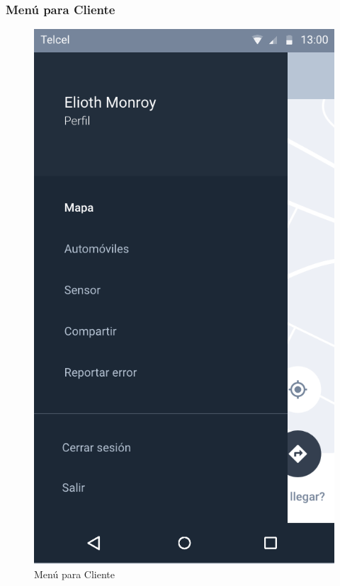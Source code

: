 \subsubsection{Menú para Cliente}\label{Menu-Cliente}
\begin{figure}[H]
	\centering
	\includegraphics[scale=.55]{Capitulo4/software/submodulos/images/menu-cliente}
	\caption{Menú para Cliente}
	\label{fig:menu-cliente}
\end{figure}

